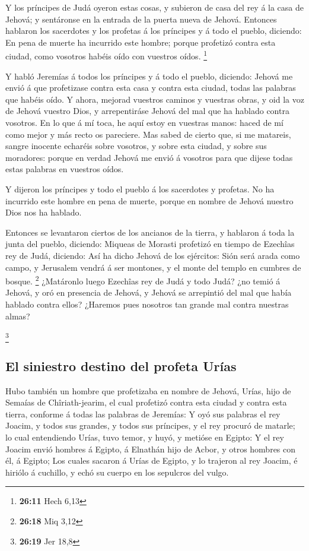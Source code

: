  Y los príncipes de Judá oyeron estas cosas, y subieron de
casa del rey á la casa de Jehová; y sentáronse en la entrada de la
puerta nueva de Jehová.  Entonces hablaron los sacerdotes y
los profetas á los príncipes y á todo el pueblo, diciendo: En pena de
muerte ha incurrido este hombre; porque profetizó contra esta ciudad,
como vosotros habéis oído con vuestros oídos. \footnote{\textbf{26:11}
  Hech 6,13}

 Y habló Jeremías á todos los príncipes y á todo el pueblo,
diciendo: Jehová me envió á que profetizase contra esta casa y contra
esta ciudad, todas las palabras que habéis oído.  Y ahora,
mejorad vuestros caminos y vuestras obras, y oid la voz de Jehová
vuestro Dios, y arrepentiráse Jehová del mal que ha hablado contra
vosotros.  En lo que á mí toca, he aquí estoy en vuestras
manos: haced de mí como mejor y más recto os pareciere. 
Mas sabed de cierto que, si me matareis, sangre inocente echaréis sobre
vosotros, y sobre esta ciudad, y sobre sus moradores: porque en verdad
Jehová me envió á vosotros para que dijese todas estas palabras en
vuestros oídos.

 Y dijeron los príncipes y todo el pueblo á los sacerdotes
y profetas. No ha incurrido este hombre en pena de muerte, porque en
nombre de Jehová nuestro Dios nos ha hablado.

 Entonces se levantaron ciertos de los ancianos de la
tierra, y hablaron á toda la junta del pueblo, diciendo: 
Miqueas de Morasti profetizó en tiempo de Ezechîas rey de Judá,
diciendo: Así ha dicho Jehová de los ejércitos: Sión será arada como
campo, y Jerusalem vendrá á ser montones, y el monte del templo en
cumbres de bosque. \footnote{\textbf{26:18} Miq 3,12} 
¿Matáronlo luego Ezechîas rey de Judá y todo Judá? ¿no temió á Jehová, y
oró en presencia de Jehová, y Jehová se arrepintió del mal que había
hablado contra ellos? ¿Haremos pues nosotros tan grande mal contra
nuestras almas?

\footnote{\textbf{26:19} Jer 18,8}

\hypertarget{el-siniestro-destino-del-profeta-uruxedas}{%
\subsection{El siniestro destino del profeta
Urías}\label{el-siniestro-destino-del-profeta-uruxedas}}

 Hubo también un hombre que profetizaba en nombre de
Jehová, Urías, hijo de Semaías de Chîriath-jearim, el cual profetizó
contra esta ciudad y contra esta tierra, conforme á todas las palabras
de Jeremías:  Y oyó sus palabras el rey Joacim, y todos sus
grandes, y todos sus príncipes, y el rey procuró de matarle; lo cual
entendiendo Urías, tuvo temor, y huyó, y metióse en Egipto:
 Y el rey Joacim envió hombres á Egipto, á Elnathán hijo de
Acbor, y otros hombres con él, á Egipto;  Los cuales
sacaron á Urías de Egipto, y lo trajeron al rey Joacim, é hiriólo á
cuchillo, y echó su cuerpo en los sepulcros del vulgo.

